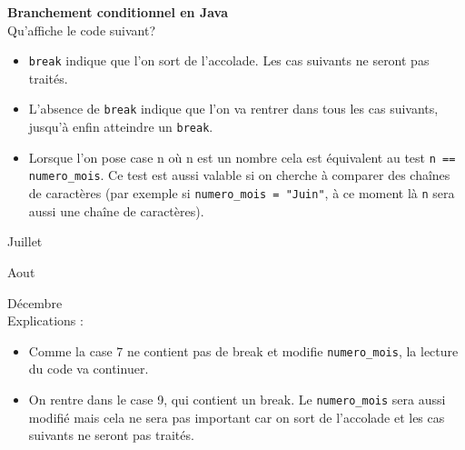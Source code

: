 \begin{Exercice}[10 minutes] \textbf{Branchement conditionnel en Java}\\
  Qu'affiche le code suivant? 
  
  
   
    \begin{conseil}
      	\begin{itemize}
      		\item \lstinline{break} indique que l'on sort de l'accolade. Les cas suivants ne seront pas traités.
      		\item L'absence de \lstinline{break} indique que l'on va rentrer dans tous les cas suivants, jusqu'à enfin atteindre un \lstinline{break}.
      		\item Lorsque l'on pose case n où n est un nombre cela est équivalent au test \lstinline{n == numero_mois}. Ce test est aussi valable si on cherche à comparer des chaînes de caractères (par exemple si \lstinline{numero_mois = "Juin"}, à ce moment là \lstinline{n} sera aussi une chaîne de caractères).
      	\end{itemize}
        
    \end{conseil}
    \begin{solution}
    
    Juillet
    
	Aout
	
	Décembre \\
	
	Explications : \\
	
	\begin{itemize}
      		\item Comme la case 7 ne contient pas de break et modifie \lstinline{numero_mois}, la lecture du code va continuer.
      		\item On rentre dans le case 9, qui contient un break. Le \lstinline{numero_mois} sera aussi modifié mais cela ne sera pas important car on sort de l'accolade et les cas suivants ne seront pas traités.
      \end{itemize}
           
    \end{solution}   
\end{Exercice}

